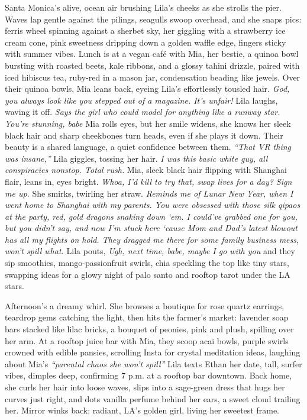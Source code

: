 \documentclass[12pt,oneside]{book} %
\begin{document}
Santa Monica’s alive, ocean air brushing Lila’s cheeks as she strolls the pier. Waves lap gentle against the pilings, seagulls swoop overhead, and she snaps pics: ferris wheel spinning against a sherbet sky, her giggling with a strawberry ice cream cone, pink sweetness dripping down a golden waffle edge, fingers sticky with summer vibes. Lunch is at a vegan café with Mia, her bestie, a quinoa bowl bursting with roasted beets, kale ribbons, and a glossy tahini drizzle, paired with iced hibiscus tea, ruby-red in a mason jar, condensation beading like jewels. Over their quinoa bowls, Mia leans back, eyeing Lila’s effortlessly tousled hair. \textit{God, you always look like you stepped out of a magazine. It’s unfair!} Lila laughs, waving it off. \textit{Says the girl who could model for anything like a runway star. You’re stunning, babe} Mia rolls eyes, but her smile widens, she knows her sleek black hair and sharp cheekbones turn heads, even if she plays it down. Their beauty is a shared language, a quiet confidence between them. \textit{“That VR thing was insane,”} Lila giggles, tossing her hair. \textit{I was this basic white guy, all conspiracies nonstop. Total rush.} Mia, sleek black hair flipping with Shanghai flair, leans in, eyes bright. \textit{Whoa, I’d kill to try that, swap lives for a day? Sign me up.} She smirks, twirling her straw. \textit{Reminds me of Lunar New Year, when I went home to Shanghai with my parents. You were obsessed with those silk qipaos at the party, red, gold dragons snaking down ‘em. I could’ve grabbed one for you, but you didn’t say, and now I’m stuck here ‘cause Mom and Dad’s latest blowout has all my flights on hold. They dragged me there for some family business mess, won’t spill what.} Lila pouts, \textit{Ugh, next time, babe, maybe I go with you} and they sip smoothies, mango-passionfruit swirls, chia speckling the top like tiny stars, swapping ideas for a glowy night of palo santo and rooftop tarot under the LA stars.

Afternoon’s a dreamy whirl. She browses a boutique for rose quartz earrings, teardrop gems catching the light, then hits the farmer’s market: lavender soap bars stacked like lilac bricks, a bouquet of peonies, pink and plush, spilling over her arm. At a rooftop juice bar with Mia, they scoop acai bowls, purple swirls crowned with edible pansies, scrolling Insta for crystal meditation ideas, laughing about Mia’s \textit{“parental chaos she won’t spill”} Lila texts Ethan her date, tall, surfer vibes, dimples deep, confirming 7 p.m. at a rooftop bar downtown. Back home, she curls her hair into loose waves, slips into a sage-green dress that hugs her curves just right, and dots vanilla perfume behind her ears, a sweet cloud trailing her. Mirror winks back: radiant, LA’s golden girl, living her sweetest frame.
\end{document}
